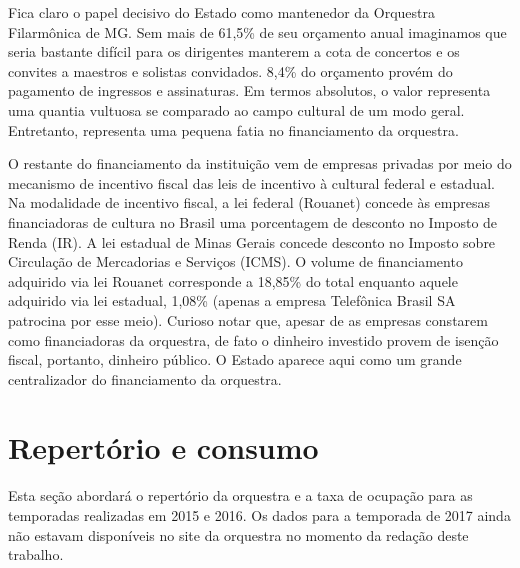 \documentclass[a4paper, 12pt, openright, oneside, german, french, english, brazil]{abntex2}
\begin{document}
	
	
	Fica claro o papel decisivo do Estado como mantenedor da Orquestra Filarmônica de MG. Sem mais de 61,5\% de seu orçamento anual imaginamos que seria bastante difícil para os dirigentes manterem a cota de concertos e os convites a maestros e solistas convidados. 8,4\% do orçamento provém do pagamento de ingressos e assinaturas. Em termos absolutos, o valor representa uma quantia vultuosa se comparado ao campo cultural de um modo geral. Entretanto, representa uma pequena fatia no financiamento da orquestra.
	
	
	
	O restante do financiamento da instituição vem de empresas privadas por meio do mecanismo de incentivo fiscal das leis de incentivo à cultural federal e estadual. Na modalidade de incentivo fiscal, a lei federal (Rouanet) concede às empresas financiadoras de cultura no Brasil uma porcentagem de desconto no Imposto de Renda (IR). A lei estadual de Minas Gerais concede desconto no Imposto sobre Circulação de Mercadorias e Serviços (ICMS). O volume de financiamento adquirido via lei Rouanet corresponde a 18,85\% do total enquanto aquele adquirido via lei estadual, 1,08\% (apenas a empresa Telefônica Brasil SA patrocina por esse meio). Curioso notar que, apesar de as empresas constarem como financiadoras da orquestra, de fato o dinheiro investido provem de isenção fiscal, portanto, dinheiro público. O Estado aparece aqui como um grande centralizador do financiamento da orquestra.
	
	
	\section{Repertório e consumo}
	
	
	Esta seção abordará o repertório da orquestra e a taxa de ocupação para as temporadas realizadas em 2015 e 2016. Os dados para a temporada de 2017 ainda não estavam disponíveis no site da orquestra no momento da redação deste trabalho.
	
\end{document}
